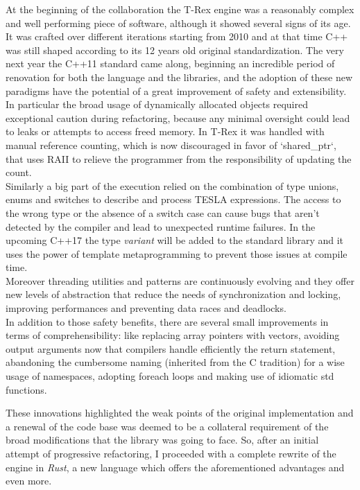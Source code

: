 At the beginning of the collaboration the T-Rex engine was a reasonably complex and well performing piece of software, although it showed several signs of its age. It was crafted over different iterations starting from 2010 and at that time C++ was still shaped according to its 12 years old original standardization. The very next year the C++11 standard came along, beginning an incredible period of renovation for both the language and the libraries, and the adoption of these new paradigms have the potential of a great improvement of safety and extensibility.\\
In particular the broad usage of dynamically allocated objects required exceptional caution during refactoring, because any minimal oversight could lead to leaks or attempts to access freed memory. In T-Rex it was handled with manual reference counting, which is now discouraged in favor of `shared_ptr`, that uses RAII to relieve the programmer from the responsibility of updating the count.\\
Similarly a big part of the execution relied on the combination of type unions, enums and switches to describe and process TESLA expressions. The access to the wrong type or the absence of a switch case can cause bugs that aren't detected by the compiler and lead to unexpected runtime failures. In the upcoming C++17 the type \emph{variant} will be added to the standard library and it uses the power of template metaprogramming to prevent those issues at compile time.\\
Moreover threading utilities and patterns are continuously evolving and they offer new levels of abstraction that reduce the needs of synchronization and locking, improving performances and preventing data races and deadlocks.\\
In addition to those safety benefits, there are several small improvements in terms of comprehensibility: like replacing array pointers with vectors, avoiding output arguments now that compilers handle efficiently the return statement, abandoning the cumbersome naming (inherited from the C tradition) for a wise usage of namespaces, adopting foreach loops and making use of idiomatic std functions.

These innovations highlighted the weak points of the original implementation and a renewal of the code base was deemed to be a collateral requirement of the broad modifications that the library was going to face. So, after an initial attempt of progressive refactoring, I proceeded with a complete rewrite of the engine in \emph{Rust}, a new language which offers the aforementioned advantages and even more.

